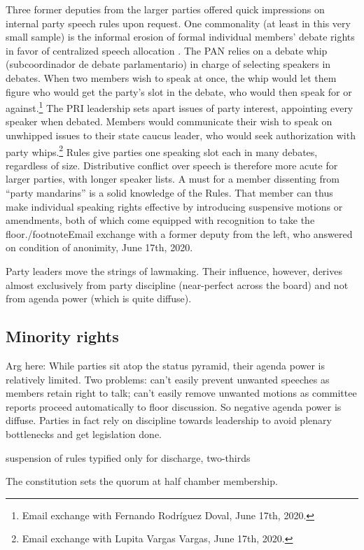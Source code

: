 \documentclass[letter,12pt]{article}
\begin{document}
Three former deputies from the larger parties offered quick impressions on internal party speech rules upon request. One commonality (at least in this very small sample) is the informal erosion of formal individual members' debate rights in favor of centralized speech allocation \citep[cf.][]{cox.1987}. The PAN relies on a debate whip (subcoordinador de debate parlamentario) in charge of selecting speakers in debates. When two members wish to speak at once, the whip would let them figure who would get the party's slot in the debate, who would then speak for or against.\footnote{Email exchange with Fernando Rodríguez Doval, June 17th, 2020.} The PRI leadership sets apart issues of party interest, appointing every speaker when debated. Members would communicate their wish to speak on unwhipped issues to their state caucus leader, who would seek authorization with party whips.\footnote{Email exchange with Lupita Vargas Vargas, June 17th, 2020.} Rules give parties one speaking slot each in many debates, regardless of size. Distributive conflict over speech is therefore more acute for larger parties, with longer speaker lists. A must for a member dissenting from ``party mandarins'' is a solid knowledge of the Rules. That member can thus make individual speaking rights effective by introducing suspensive motions or amendments, both of which come equipped with recognition to take the floor./footnote{Email exchange with a former deputy from the left, who answered on condition of anonimity, June 17th, 2020.} 

Party leaders move the strings of lawmaking. Their influence, however, derives almost exclusively from party discipline (near-perfect across the board) and not from agenda power (which is quite diffuse). 

  \subsection{Minority rights}
Arg here: While parties sit atop the status pyramid, their agenda power is relatively limited. 
Two problems: can't easily prevent unwanted speeches as members retain right to talk; can't easily remove unwanted motions as committee reports proceed automatically to floor discussion. So negative agenda power is diffuse. 
Parties in fact rely on discipline towards leadership to avoid plenary bottlenecks and get legislation done. 

suspension of rules typified only for discharge, two-thirds

The constitution sets the quorum at half chamber membership.
\end{document}

